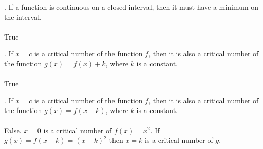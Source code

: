 \documentclass[11pt]{article}
\begin{document}
\vspace{1cm}
. If a function is continuous on a closed interval, then it must have a minimum on the interval.\\
\\
\indent True

\vspace{1cm}
. If $x=c$ is a critical number of the function $f$, then it is also a critical number of the function $g(x)=f(x)+k$, where $k$ is a constant.\\
\\
\indent True

\vspace{1cm}
. If $x=c$ is a critical number of the function $f$, then it is also a critical number of the function $g(x)=f(x-k)$, where $k$ is a constant.\\
\\
\indent False. $x=0$ is a critical number of $f(x)=x^2$. If $g(x)=f(x-k)=(x-k)^2$ then $x=k$ is a critical number of $g$.
\end{document}
